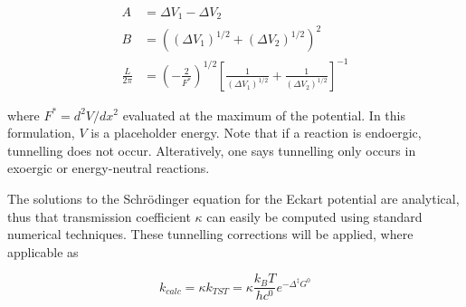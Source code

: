 \begin{align}
  A &= \Delta V_1 - \Delta V_2 \\
  B &= ((\Delta V_1)^{1/2} + (\Delta V_2)^{1/2})^2 \\
 \frac{L}{2\pi} &= (-\frac{2}{F^*})^{1/2} [\frac{1}{(\Delta V_1)^{1/2}} +
      \frac{1}{(\Delta V_2)^{1/2}}]^{-1}
\end{align}

\noindent where $F^* = d^2V/dx^2$ evaluated at the maximum of the potential. In
this formulation, $V$ is a placeholder energy. Note that if a reaction is
endoergic, tunnelling does not occur. Alteratively, one says tunnelling only
occurs in exoergic or energy-neutral reactions.

The solutions to the Schr{\"o}dinger equation for the Eckart potential are
analytical, thus that transmission coefficient $\kappa$ can easily be computed
using standard numerical techniques. These tunnelling corrections will be
applied, where applicable as

\begin{equation}
  k_{calc} = \kappa k_{TST} = \kappa
\frac{k_BT}{hc^0}e^{-\Delta^\ddagger G^0}
\end{equation}
